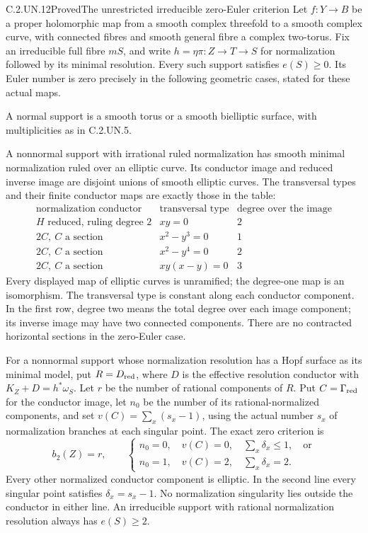 \begin{statement}{C.2.UN.12}{Proved}{The unrestricted irreducible zero-Euler criterion}
Let $f:Y\to B$ be a proper holomorphic map from a smooth
complex threefold to a smooth complex curve, with connected
fibres and smooth general fibre a complex two-torus. Fix an
irreducible full fibre $mS$, and write
$h=\eta\pi:Z\to T\to S$ for normalization followed by its
minimal resolution. Every such support satisfies $e(S)\ge0$.
Its Euler number is zero precisely in the following geometric
cases, stated for these actual maps.

A normal support is a smooth torus or a smooth bielliptic
surface, with multiplicities as in C.2.UN.5.

A nonnormal support with irrational ruled normalization has
smooth minimal normalization ruled over an elliptic curve.
Its conductor image and reduced inverse image are disjoint
unions of smooth elliptic curves. The transversal types and
their finite conductor maps are exactly those in the table:
\[
\begin{array}{c|c|c}
 \text{normalization conductor}&\text{transversal type}
       &\text{degree over the image}\\ \hline
 H\text{ reduced, ruling degree }2&xy=0&2\\
 2C,\ C\text{ a section}&x^2-y^3=0&1\\
 2C,\ C\text{ a section}&x^2-y^4=0&2\\
 2C,\ C\text{ a section}&xy(x-y)=0&3
\end{array}                                                   \tag{C.IZ.1}
\]
Every displayed map of elliptic curves is unramified; the
degree-one map is an isomorphism. The transversal type is
constant along each conductor component. In the first row,
degree two means the total degree over each image component;
its inverse image may have two connected components. There are no
contracted horizontal sections in the zero-Euler case.

For a nonnormal support whose normalization resolution
has a Hopf surface as its minimal model, put $R=D_{\rm red}$,
where $D$ is the effective
resolution conductor with $K_Z+D=h^*\omega_S$. Let $r$ be
the number of rational components of $R$. Put
$C=\Gamma_{\rm red}$ for the conductor image, let $n_0$ be
the number of its rational-normalized components, and set
$v(C)=\sum_x(s_x-1)$, using the actual number $s_x$ of
normalization branches at each singular point. The exact
zero criterion is
\[
 b_2(Z)=r,\qquad
 \begin{cases}
 n_0=0,\quad v(C)=0,\quad\sum_x\delta_x\le1,\quad\text{or}\\
 n_0=1,\quad v(C)=2,\quad\sum_x\delta_x=2.
 \end{cases}                                                   \tag{C.IZ.2}
\]
Every other normalized conductor component is elliptic.
In the second line every singular point satisfies
$\delta_x=s_x-1$. No normalization singularity lies outside
the conductor in either line. An irreducible support with
rational normalization resolution always has $e(S)\ge2$.


\end{statement}
